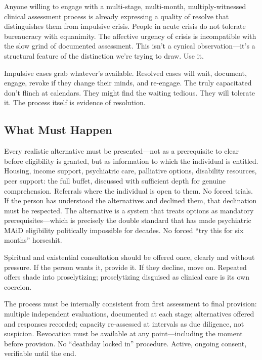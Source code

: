 \documentclass[10pt, letterpaper, twocolumn]{article}
\begin{document}
Anyone willing to engage with a multi-stage, multi-month, multiply-witnessed clinical assessment process is already expressing a quality of resolve that distinguishes them from impulsive crisis. People in acute crisis do not tolerate bureaucracy with equanimity. The affective urgency of crisis is incompatible with the slow grind of documented assessment. This isn't a cynical observation---it's a structural feature of the distinction we're trying to draw. Use it.

Impulsive cases grab whatever's available. Resolved cases will wait, document, engage, revoke if they change their minds, and re-engage. The truly capacitated don't flinch at calendars. They might find the waiting tedious. They will tolerate it. The process itself is evidence of resolution.

\subsection{What Must Happen}

Every realistic alternative must be presented---not as a prerequisite to clear before eligibility is granted, but as information to which the individual is entitled. Housing, income support, psychiatric care, palliative options, disability resources, peer support: the full buffet, discussed with sufficient depth for genuine comprehension. Referrals where the individual is open to them. No forced trials. If the person has understood the alternatives and declined them, that declination must be respected. The alternative is a system that treats options as mandatory prerequisites---which is precisely the double standard that has made psychiatric MAiD eligibility politically impossible for decades. No forced ``try this for six months'' horseshit.

Spiritual and existential consultation should be offered once, clearly and without pressure. If the person wants it, provide it. If they decline, move on. Repeated offers shade into proselytizing; proselytizing disguised as clinical care is its own coercion.

The process must be internally consistent from first assessment to final provision: multiple independent evaluations, documented at each stage; alternatives offered and responses recorded; capacity re-assessed at intervals as due diligence, not suspicion. Revocation must be available at any point---including the moment before provision. No ``deathday locked in'' procedure. Active, ongoing consent, verifiable until the end.
\end{document}
